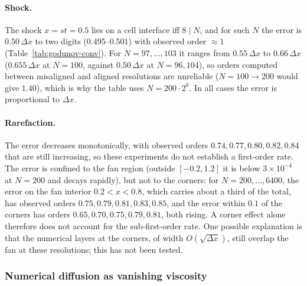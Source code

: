 \paragraph{Shock.} The shock $x=st=0.5$ lies on a cell interface iff $8\mid N$,
and for such $N$ the error is $0.50\,\Delta x$ to two digits ($0.495$--$0.501$)
with observed order $\approx1$ (Table~\ref{tab:godunov-conv}). For
$N=97,\dots,103$ it ranges from $0.55\,\Delta x$ to $0.66\,\Delta x$
($0.655\,\Delta x$ at $N=100$, against $0.50\,\Delta x$ at $N=96,104$), so orders
computed between misaligned and aligned resolutions are unreliable ($N=100\to200$
would give $1.40$), which is why the table uses $N=200\cdot2^k$. In all cases the
error is proportional to $\Delta x$.

\paragraph{Rarefaction.} The error decreases monotonically, with observed orders
$0.74,0.77,0.80,0.82,0.84$ that are still increasing, so these experiments do not
establish a first-order rate. The error is confined to the fan region (outside
$[-0.2,1.2]$ it is below $3\times10^{-4}$ at $N=200$ and decays rapidly), but not
to the corners: for $N=200,\dots,6400$, the error on the fan interior
$0.2<x<0.8$, which carries about a third of the total, has observed orders
$0.75,0.79,0.81,0.83,0.85$, and the error within $0.1$ of the corners has orders
$0.65,0.70,0.75,0.79,0.81$, both rising. A corner effect alone therefore does not
account for the sub-first-order rate. One possible explanation is that the
numerical layers at the corners, of width $O(\sqrt{\Delta x})$, still overlap the
fan at these resolutions; this has not been tested.

\subsubsection{Numerical diffusion as vanishing viscosity}
\label{subsubsec:numerical-viscosity}

